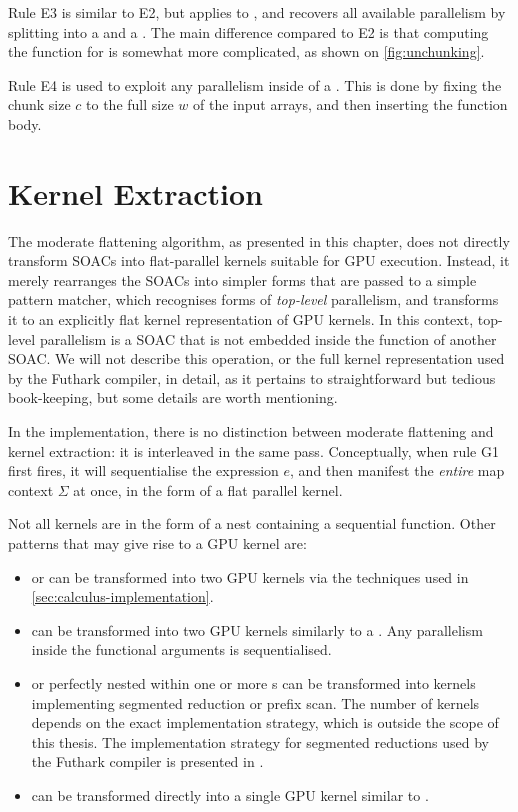 Rule E3 is similar to E2, but applies to \StreamPar{}, and recovers
all available parallelism by splitting into a  and a
.  The main difference compared to E2 is that computing the
function for  is somewhat more complicated, as shown on
\cref{fig:unchunking}.

Rule E4 is used to exploit any parallelism inside of a \StreamSeq{}.
This is done by fixing the chunk size $c$ to the full size $w$ of the
input arrays, and then inserting the function body.

\section{Kernel Extraction}

The moderate flattening algorithm, as presented in this chapter, does
not directly transform SOACs into flat-parallel kernels suitable for
GPU execution.  Instead, it merely rearranges the SOACs into simpler
forms that are passed to a simple pattern matcher, which recognises
forms of \textit{top-level} parallelism, and transforms it to an
explicitly flat kernel representation of GPU kernels.  In this
context, top-level parallelism is a SOAC that is not embedded inside
the function of another SOAC.  We will not describe this operation, or
the full kernel representation used by the Futhark compiler, in
detail, as it pertains to straightforward but tedious book-keeping,
but some details are worth mentioning.

In the implementation, there is no distinction between moderate
flattening and kernel extraction: it is interleaved in the same pass.
Conceptually, when rule G1 first fires, it will sequentialise the
expression $e$, and then manifest the \textit{entire} map context
$\Sigma$ at once, in the form of a flat parallel kernel.

Not all kernels are in the form of a  nest containing a
sequential function.  Other patterns that may give rise to a GPU
kernel are:

\begin{itemize}
\item {} or  can be transformed into two GPU
  kernels via the techniques used in
  \cref{sec:calculus-implementation}.
\item \StreamPar{} can be transformed into two GPU kernels similarly
  to a .  Any parallelism inside the functional arguments
  is sequentialised.
\item {} or  perfectly nested within one or
  more s can be transformed into kernels implementing
  segmented reduction or prefix scan.  The number of kernels depends
  on the exact implementation strategy, which is outside the scope of
  this thesis.  The implementation strategy for segmented reductions
  used by the Futhark compiler is presented in
  \cite{Futhark:segredomap}.
\item {} can be transformed directly into a single GPU
  kernel similar to .
\end{itemize}

